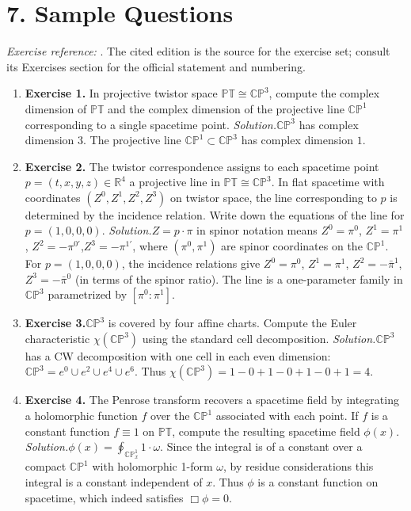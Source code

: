 \section*{7. Sample Questions}
\emph{Exercise reference:} \cite{twistor_ref1}. The cited edition is the source for the exercise set; consult its Exercises section for the official statement and numbering.
\begin{enumerate}[leftmargin=*,itemsep=0.9em]
\item \textbf{Exercise 1.} In projective twistor space $\mathbb{PT} \cong \mathbb{CP}^3$, compute the complex dimension of $\mathbb{PT}$ and the complex dimension of the projective line $\mathbb{CP}^1$ corresponding to a single spacetime point. \emph{Solution.}$\mathbb{CP}^3$ has complex dimension $3$. The projective line $\mathbb{CP}^1 \subset \mathbb{CP}^3$ has complex dimension $1$.

\item \textbf{Exercise 2.} The twistor correspondence assigns to each spacetime point $p = (t, x, y, z) \in \mathbb{R}^4$ a projective line in $\mathbb{PT} \cong \mathbb{CP}^3$. In flat spacetime with coordinates $(Z^0, Z^1, Z^2, Z^3)$ on twistor space, the line corresponding to $p$ is determined by the incidence relation. Write down the equations of the line for $p = (1, 0, 0, 0)$. \emph{Solution.}$Z = p \cdot \pi$ in spinor notation means $Z^0 = \pi^0$, $Z^1 = \pi^1$, $Z^2 = -\pi^{0'}$,$ Z^3 = -\pi^{1'}$, where $(\pi^0, \pi^1)$ are spinor coordinates on the $\mathbb{CP}^1$. For $p = (1,0,0,0)$, the incidence relations give $Z^0 = \pi^0$, $Z^1 = \pi^1$, $Z^2 = -\bar{\pi}^1$, $Z^3 = -\bar{\pi}^0$ (in terms of the spinor ratio). The line is a one-parameter family in $\mathbb{CP}^3$ parametrized by $[\pi^0 : \pi^1]$.

\item \textbf{Exercise 3.}$\mathbb{CP}^3$ is covered by four affine charts. Compute the Euler characteristic $\chi(\mathbb{CP}^3)$ using the standard cell decomposition. \emph{Solution.}$\mathbb{CP}^3$ has a CW decomposition with one cell in each even dimension: $\mathbb{CP}^3 = e^0 \cup e^2 \cup e^4 \cup e^6$. Thus $\chi(\mathbb{CP}^3) = 1 - 0 + 1 - 0 + 1 - 0 + 1 = 4$.

\item \textbf{Exercise 4.} The Penrose transform recovers a spacetime field by integrating a holomorphic function $f$ over the $\mathbb{CP}^1$ associated with each point. If $f$ is a constant function $f \equiv 1$ on $\mathbb{PT}$, compute the resulting spacetime field $\phi(x)$. \emph{Solution.}$\phi(x) = \oint_{\mathbb{CP}^1_x} 1 \cdot \omega$. Since the integral is of a constant over a compact $\mathbb{CP}^1$ with holomorphic 1-form $\omega$, by residue considerations this integral is a constant independent of $x$. Thus $\phi$ is a constant function on spacetime, which indeed satisfies $\Box\phi = 0$.


\end{enumerate}
